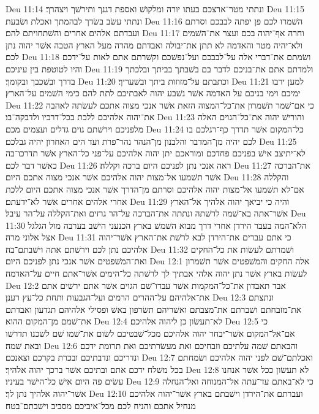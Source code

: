 Deu 11:14  ונתתי מטר־ארצכם בעתו יורה ומלקושׁ ואספת דגנך ותירשׁך ויצהרך׃
Deu 11:15  ונתתי עשׂב בשׂדך לבהמתך ואכלת ושׂבעת׃
Deu 11:16  השׁמרו לכם פן יפתה לבבכם וסרתם ועבדתם אלהים אחרים והשׁתחויתם להם׃
Deu 11:17  וחרה אף־יהוה בכם ועצר את־השׁמים ולא־יהיה מטר והאדמה לא תתן את־יבולה ואבדתם מהרה מעל הארץ הטבה אשׁר יהוה נתן לכם׃
Deu 11:18  ושׂמתם את־דברי אלה על־לבבכם ועל־נפשׁכם וקשׁרתם אתם לאות על־ידכם והיו לטוטפת בין עיניכם׃
Deu 11:19  ולמדתם אתם את־בניכם לדבר בם בשׁבתך בביתך ובלכתך בדרך ובשׁכבך ובקומך׃
Deu 11:20  וכתבתם על־מזוזות ביתך ובשׁעריך׃
Deu 11:21  למען ירבו ימיכם וימי בניכם על האדמה אשׁר נשׁבע יהוה לאבתיכם לתת להם כימי השׁמים על־הארץ׃
Deu 11:22  כי אם־שׁמר תשׁמרון את־כל־המצוה הזאת אשׁר אנכי מצוה אתכם לעשׂתה לאהבה את־יהוה אלהיכם ללכת בכל־דרכיו ולדבקה־בו׃
Deu 11:23  והורישׁ יהוה את־כל־הגוים האלה מלפניכם וירשׁתם גוים גדלים ועצמים מכם׃
Deu 11:24  כל־המקום אשׁר תדרך כף־רגלכם בו לכם יהיה מן־המדבר והלבנון מן־הנהר נהר־פרת ועד הים האחרון יהיה גבלכם׃
Deu 11:25  לא־יתיצב אישׁ בפניכם פחדכם ומוראכם יתן יהוה אלהיכם על־פני כל־הארץ אשׁר תדרכו־בה כאשׁר דבר לכם׃
Deu 11:26  ראה אנכי נתן לפניכם היום ברכה וקללה׃
Deu 11:27  את־הברכה אשׁר תשׁמעו אל־מצות יהוה אלהיכם אשׁר אנכי מצוה אתכם היום׃
Deu 11:28  והקללה אם־לא תשׁמעו אל־מצות יהוה אלהיכם וסרתם מן־הדרך אשׁר אנכי מצוה אתכם היום ללכת אחרי אלהים אחרים אשׁר לא־ידעתם׃
Deu 11:29  והיה כי יביאך יהוה אלהיך אל־הארץ אשׁר־אתה בא־שׁמה לרשׁתה ונתתה את־הברכה על־הר גרזים ואת־הקללה על־הר עיבל׃
Deu 11:30  הלא־המה בעבר הירדן אחרי דרך מבוא השׁמשׁ בארץ הכנעני הישׁב בערבה מול הגלגל אצל אלוני מרה׃
Deu 11:31  כי אתם עברים את־הירדן לבא לרשׁת את־הארץ אשׁר־יהוה אלהיכם נתן לכם וירשׁתם אתה וישׁבתם־בה׃
Deu 11:32  ושׁמרתם לעשׂות את כל־החקים ואת־המשׁפטים אשׁר אנכי נתן לפניכם היום׃
Deu 12:1  אלה החקים והמשׁפטים אשׁר תשׁמרון לעשׂות בארץ אשׁר נתן יהוה אלהי אבתיך לך לרשׁתה כל־הימים אשׁר־אתם חיים על־האדמה׃
Deu 12:2  אבד תאבדון את־כל־המקמות אשׁר עבדו־שׁם הגוים אשׁר אתם ירשׁים אתם את־אלהיהם על־ההרים הרמים ועל־הגבעות ותחת כל־עץ רענן׃
Deu 12:3  ונתצתם את־מזבחתם ושׁברתם את־מצבתם ואשׁריהם תשׂרפון באשׁ ופסילי אלהיהם תגדעון ואבדתם את־שׁמם מן־המקום ההוא׃
Deu 12:4  לא־תעשׂון כן ליהוה אלהיכם׃
Deu 12:5  כי אם־אל־המקום אשׁר־יבחר יהוה אלהיכם מכל־שׁבטיכם לשׂום את־שׁמו שׁם לשׁכנו תדרשׁו ובאת שׁמה׃
Deu 12:6  והבאתם שׁמה עלתיכם וזבחיכם ואת מעשׂרתיכם ואת תרומת ידכם ונדריכם ונדבתיכם ובכרת בקרכם וצאנכם׃
Deu 12:7  ואכלתם־שׁם לפני יהוה אלהיכם ושׂמחתם בכל משׁלח ידכם אתם ובתיכם אשׁר ברכך יהוה אלהיך׃
Deu 12:8  לא תעשׂון ככל אשׁר אנחנו עשׂים פה היום אישׁ כל־הישׁר בעיניו׃
Deu 12:9  כי לא־באתם עד־עתה אל־המנוחה ואל־הנחלה אשׁר־יהוה אלהיך נתן לך׃
Deu 12:10  ועברתם את־הירדן וישׁבתם בארץ אשׁר־יהוה אלהיכם מנחיל אתכם והניח לכם מכל־איביכם מסביב וישׁבתם־בטח׃
